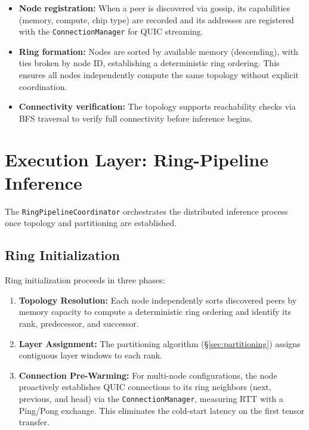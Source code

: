 \documentclass[runningheads]{llncs}
\begin{document}
\begin{itemize}
    \item \textbf{Node registration:} When a peer is discovered via gossip, its capabilities (memory, compute, chip type) are recorded and its addresses are registered with the \texttt{ConnectionManager} for QUIC streaming.
    \item \textbf{Ring formation:} Nodes are sorted by available memory (descending), with ties broken by node ID, establishing a deterministic ring ordering. This ensures all nodes independently compute the same topology without explicit coordination.
    \item \textbf{Connectivity verification:} The topology supports reachability checks via BFS traversal to verify full connectivity before inference begins.
\end{itemize}

\section{Execution Layer: Ring-Pipeline Inference}
\label{sec:execution}

The \texttt{RingPipelineCoordinator} orchestrates the distributed inference process once topology and partitioning are established.

\subsection{Ring Initialization}
\label{sec:ring_init}

Ring initialization proceeds in three phases:

\begin{enumerate}
    \item \textbf{Topology Resolution:} Each node independently sorts discovered peers by memory capacity to compute a deterministic ring ordering and identify its rank, predecessor, and successor.
    \item \textbf{Layer Assignment:} The partitioning algorithm (\S\ref{sec:partitioning}) assigns contiguous layer windows to each rank.
    \item \textbf{Connection Pre-Warming:} For multi-node configurations, the node proactively establishes QUIC connections to its ring neighbors (next, previous, and head) via the \texttt{ConnectionManager}, measuring RTT with a Ping/Pong exchange. This eliminates the cold-start latency on the first tensor transfer.
\end{enumerate}
\end{document}
